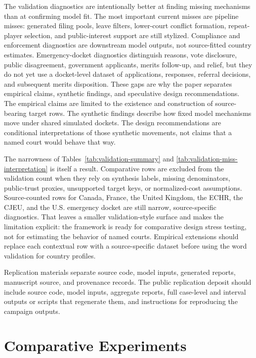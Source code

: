\documentclass[
  journal=small,
  manuscript=research-article,
  year=2026
]{cup-journal}
\begin{document}
The validation diagnostics are intentionally better at finding missing mechanisms than at confirming model fit. The most important current misses are pipeline misses: generated filing pools, leave filters, lower-court conflict formation, repeat-player selection, and public-interest support are still stylized. Compliance and enforcement diagnostics are downstream model outputs, not source-fitted country estimates. Emergency-docket diagnostics distinguish reasons, vote disclosure, public disagreement, government applicants, merits follow-up, and relief, but they do not yet use a docket-level dataset of applications, responses, referral decisions, and subsequent merits disposition. These gaps are why the paper separates empirical claims, synthetic findings, and speculative design recommendations. The empirical claims are limited to the existence and construction of source-bearing target rows. The synthetic findings describe how fixed model mechanisms move under shared simulated dockets. The design recommendations are conditional interpretations of those synthetic movements, not claims that a named court would behave that way.

The narrowness of Tables~\ref{tab:validation-summary} and \ref{tab:validation-miss-interpretation} is itself a result. Comparative rows are excluded from the validation count when they rely on synthesis labels, missing denominators, public-trust proxies, unsupported target keys, or normalized-cost assumptions. Source-counted rows for Canada, France, the United Kingdom, the ECHR, the CJEU, and the U.S. emergency docket are still narrow, source-specific diagnostics. That leaves a smaller validation-style surface and makes the limitation explicit: the framework is ready for comparative design stress testing, not for estimating the behavior of named courts. Empirical extensions should replace each contextual row with a source-specific dataset before using the word validation for country profiles.

Replication materials separate source code, model inputs, generated reports, manuscript source, and provenance records. The public replication deposit should include source code, model inputs, aggregate reports, full case-level and interval outputs or scripts that regenerate them, and instructions for reproducing the campaign outputs.

\section{Comparative Experiments}
\label{sec:experiments}
\end{document}
